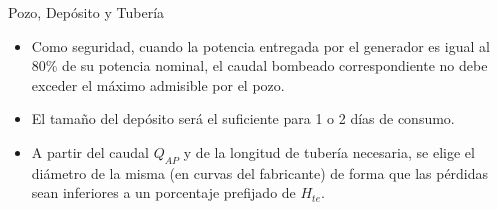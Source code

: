 \documentclass[xcolor={usenames,svgnames,dvipsnames}]{beamer}
\begin{document}
\begin{frame}[label=sec-4-6]{Pozo, Depósito y Tubería}
\begin{itemize}
\item Como seguridad, cuando la potencia entregada por el generador es igual al 80\% de su potencia nominal, el caudal bombeado correspondiente no debe exceder el máximo admisible por el pozo.
\item El tamaño del depósito será el suficiente para 1 o 2 días de consumo.
\item A partir del caudal $Q_{AP}$ y de la longitud de tubería necesaria, se elige el diámetro de la misma (en curvas del fabricante) de forma que las pérdidas sean inferiores a un porcentaje prefijado de $H_{te}$.
\end{itemize}
\end{frame}
\end{document}
